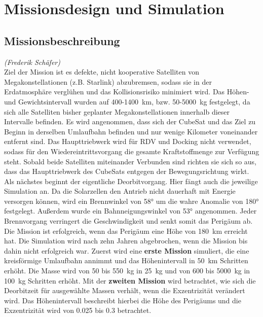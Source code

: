 \chapter{Missionsdesign und Simulation}


\section{Missionsbeschreibung}
\hfill\emph{(Frederik Schäfer)}\\
Ziel der Mission ist es defekte, nicht kooperative Satelliten von Megakonstellationen (z.B. Starlink) abzubremsen, sodass sie in der Erdatmosphäre verglühen und das Kollisionsrisiko minimiert wird. Das Höhen- und Gewichtsintervall wurden auf \num{400}-\SI{1400}{\kilo\metre}, bzw. \num{50}-\SI{5000}{\kilogram} festgelegt, da sich alle Satelliten bisher geplanter Megakonstellationen innerhalb dieser Intervalle befinden.
Es wird angenommen, dass sich der CubeSat und das Ziel zu Beginn in derselben Umlaufbahn befinden und nur wenige Kilometer voneinander entfernt sind. Das Haupttriebwerk wird für RDV und Docking nicht verwendet, sodass für den Wiedereintrittsvorgang die gesamte Kraftstoffmenge zur Verfügung steht. Sobald beide Satelliten miteinander Verbunden sind richten sie sich so aus, dass das Haupttriebwerk des CubeSats entgegen der Bewegungsrichtung wirkt. Als nächstes beginnt der eigentliche Deorbitvorgang. Hier fängt auch die jeweilige Simulation an. Da die Solarzellen den Antrieb nicht dauerhaft mit Energie versorgen können, wird ein Brennwinkel von \num{58}° um die wahre Anomalie von \num{180}° festgelegt. Außerdem wurde ein Bahnneigungswinkel von \num{53}° angenommen.
Jeder Brennvorgang verringert die Geschwindigkeit und senkt somit das Perigäum ab. Die Mission ist erfolgreich, wenn das Perigäum eine Höhe von \SI{180}{\kilo\metre} erreicht hat. Die Simulation wird nach zehn Jahren abgebrochen, wenn die Mission bis dahin nicht erfolgreich war. 
Zuerst wird eine \textbf{erste Mission} simuliert, die eine kreisförmige Umlaufbahn annimmt und das Höhenintervall in \SI{50}{\kilo\metre} Schritten erhöht. Die Masse wird von \num{50} bis \SI{550}{\kilogram} in \SI{25}{\kilogram} und von \num{600} bis \SI{5000}{\kilogram} in \SI{100}{\kilogram} Schritten erhöht.
Mit der \textbf{zweiten Mission} wird betrachtet, wie sich die Deorbitzeit für ausgewählte Massen verhält, wenn die Exzentrizität verändert wird. Das Höhenintervall beschreibt hierbei die Höhe des Perigäums und die Exzentrizität wird von \num{0.025} bis \num{0.3} betrachtet.
	
